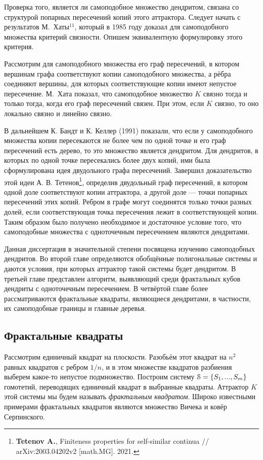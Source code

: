\documentclass[a5paper,9pt,twoside]{extarticle} %
\begin{document}
Проверка того, является ли самоподобное множество дендритом, связана со структурой попарных пересечений копий этого аттрактора.
Следует начать с результатов М.~Хаты$^{11}$, который в 1985 году доказал для самоподобного множества критерий связности.
Опишем эквивалентную формулировку этого критерия.

Рассмотрим для самоподобного множества его граф пересечений, в котором вершинам графа соответствуют копии самоподобного множества, а рёбра соединяют вершины, для которых соответствующие копии имеют непустое пересечение.
М.~Хата показал, что самоподобное множество $K$ связно тогда и только тогда, когда его граф пересечений связен.
При этом, если $K$ связно, то оно локально связно и линейно связно.

В дальнейшем К. Бандт и К. Келлер (1991) показали, что если у самоподобного множества копии пересекаются не более чем по одной точке и его граф пересечений есть дерево, то это множество является дендритом. Для дендритов, в которых по одной точке пересекались более двух копий, ими была сформулирована идея двудольного графа пересечений.
Завершил доказательство этой идеи А. В. Тетенов\footnote{{\bf Tetenov A.}, Finiteness properties for self-similar continua // arXiv:2003.04202v2 [math.MG]. 2021.}, определив двудольный граф пересечений, в котором одной доле соответствуют копии аттрактора, а другой доле --- точки попарных пересечений этих копий. Ребром в графе могут соединятся только точки разных долей, если соответствующая точка пересечения лежит в соответствующей копии.
Таким образом было получено необходимое и достаточное условие того, что самоподобные множества с одноточечным пересечением являются дендритами.

Данная диссертация в значительной степени посвящена изучению самоподобных дендритов.
Во второй главе определяются обобщённые полигональные системы и даются условия, при которых аттрактор такой системы будет дендритом.
В третьей главе представлен алгоритм, выявляющий среди фрактальных кубов дендриты с одноточечным пересечением.
В четвёртой главе более рассматриваются фрактальные квадраты, являющиеся дендритами, в частности, их самоподобные границы и главные деревья.


\subsection{Фрактальные квадраты}

Рассмотрим единичный квадрат на плоскости.
Разобьём этот квадрат на $n^2$ равных квадратов с ребром $1/n$, и в этом множестве квадратов разбиения выберем какое-то непустое подмножество.
Построим систему ${\EuScript S}=\{S_1,...,S_m\}$ гомотетий, переводящих единичный квадрат в выбранные квадраты. Аттрактор $K$ этой системы мы будем называть {\em фрактальным квадратом}.
Широко известными примерами фрактальных квадратов являются множество Вичека и ковёр Серпинского.
\end{document}
